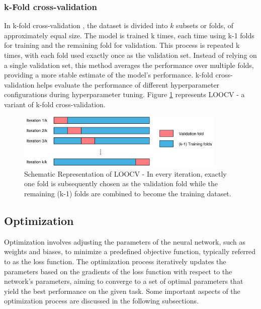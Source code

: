 \subsubsection{k-Fold cross-validation}
In k-fold cross-validation \cite{cv}, the dataset is divided into $k$ subsets or folds, of approximately equal size. The model is trained k times, each time using k-1 folds for training and the remaining fold for validation. This process is repeated k times, with each fold used exactly once as the validation set.  Instead of relying on a single validation set, this method averages the performance over multiple folds, providing a more stable estimate of the model's performance. k-fold cross-validation helps evaluate the performance of different hyperparameter configurations during hyperparameter tuning. Figure \ref{fig:crossval} represents \gls{LOOCV} - a variant of k-fold cross-validation. 
\begin{figure}[ht]
  \centering
  \includegraphics[width=10cm]{images/Theory-DL/crossval.png}
  \caption{Schematic Representation of LOOCV - In every iteration, exactly one fold is subsequently chosen as the validation fold while the remaining (k-1) folds are combined to become the training dataset.}
  \label{fig:crossval}
\end{figure}
\subsection{Optimization} 
Optimization involves adjusting the parameters of the neural network, such as weights and biases, to minimize a predefined objective function, typically referred to as the loss function. The optimization process iteratively updates the parameters based on the gradients of the loss function with respect to the network's parameters, aiming to converge to a set of optimal parameters that yield the best performance on the given task. Some important aspects of the optimization process are discussed in the following subsections. 
